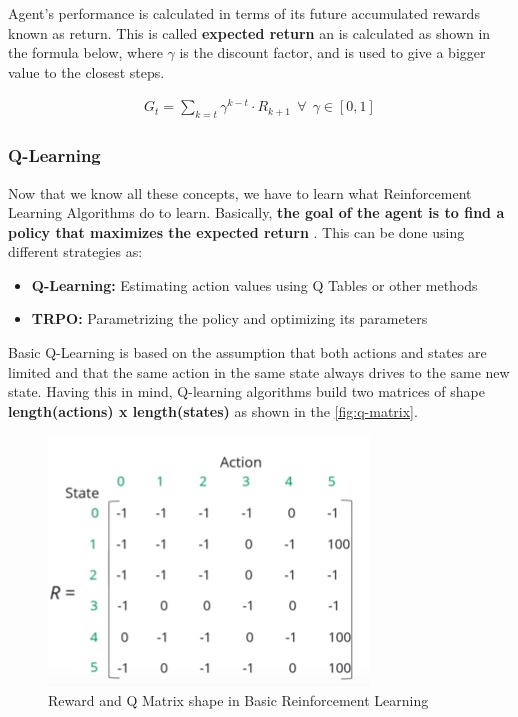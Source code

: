 			Agent's performance is calculated in terms of its future accumulated rewards known as return. This is called \textbf{expected return} an is calculated as  shown in the formula below, where $\gamma$ is the discount factor, and is used to give a bigger value to the closest steps.
			
			\begin{gather*}
				G_t = \sum_{k=t} \gamma ^{k-t} \cdot R_{k+1} \:\: \forall \:\: \gamma \in [0, 1]
			\end{gather*}
		
		
		\subsubsection{Q-Learning}
			
			Now that we know all these concepts, we have to learn what Reinforcement Learning Algorithms do to learn. Basically, \textbf{the goal of the agent is to find a policy that maximizes the expected return }. This can be done using different strategies as:
			\begin{itemize}
				\item[\textendash]\textbf{Q-Learning:} Estimating action values using Q Tables or other methods
				\item[\textendash]\textbf{TRPO:} Parametrizing the policy and optimizing its parameters
			\end{itemize}
			
			Basic Q-Learning is based on the assumption that both actions and states are limited and that the same action in the same state always drives to the same new state. Having this in mind, Q-learning algorithms build two matrices of shape \textbf{length(actions) x length(states)} as shown in the \autoref{fig:q-matrix}.
			
			\begin{figure}[h]
				\centering
				\includegraphics[width=1\linewidth]{Images/Q-Matrix}
				\caption[Q-Matrix]{Reward and Q Matrix shape in Basic Reinforcement Learning}
				\label{fig:q-matrix}
			\end{figure}
			
